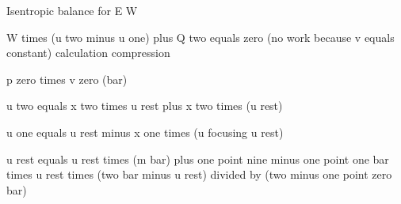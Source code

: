 Isentropic balance for E W

W times (u two minus u one) plus Q two equals zero (no work because v equals constant) calculation compression

p zero times v zero (bar)

u two equals x two times u rest plus x two times (u rest)

u one equals u rest minus x one times (u focusing u rest)

u rest equals u rest times (m bar) plus one point nine minus one point one bar times u rest times (two bar minus u rest) divided by (two minus one point zero bar)